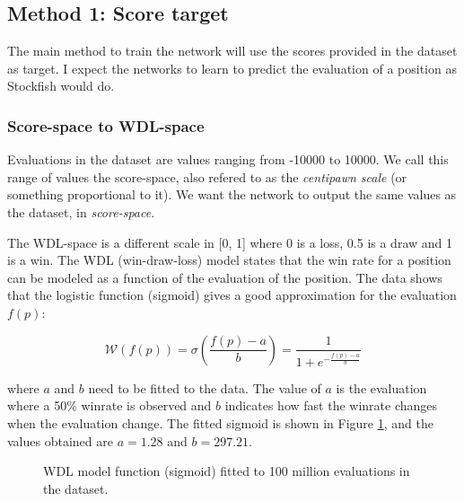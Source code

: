 

\subsection{Method 1: Score target}

The main method to train the network will use the scores provided in the dataset as target. I expect the networks to learn to predict the evaluation of a position as Stockfish would do.

\setcounter{secnumdepth}{4}
\subsubsection{Score-space to WDL-space}

Evaluations in the dataset are values ranging from -10000 to 10000. We call this range of values the score-space, also refered to as the \textit{centipawn scale} (or something proportional to it). We want the network to output the same values as the dataset, in \textit{score-space}.

The WDL-space is a different scale in [0, 1] where 0 is a loss, 0.5 is a draw and 1 is a win. The WDL (win-draw-loss) model \cite{wdl-model} states that the win rate for a position can be modeled as a function of the evaluation of the position. The data shows that the logistic function (sigmoid) gives a good approximation for the evaluation $f(p)$:

\[
\mathcal{W}(f(p)) = \sigma\left(\frac{f(p)-a}{b}\right) = \frac{1}{1 + e^{-\frac{f(p)-a}{b}}}
\]

where $a$ and $b$ need to be fitted to the data. The value of $a$ is the evaluation where a 50\% winrate is observed and $b$ indicates how fast the winrate changes when the evaluation change. The fitted sigmoid is shown in Figure \ref{wdl-fit}, and the values obtained are $a=1.28$ and $b=297.21$.

\begin{figure}[H]
\centering
{}
\caption{WDL model function (sigmoid) fitted to 100 million evaluations in the dataset.}
\label{wdl-fit}
\end{figure}


